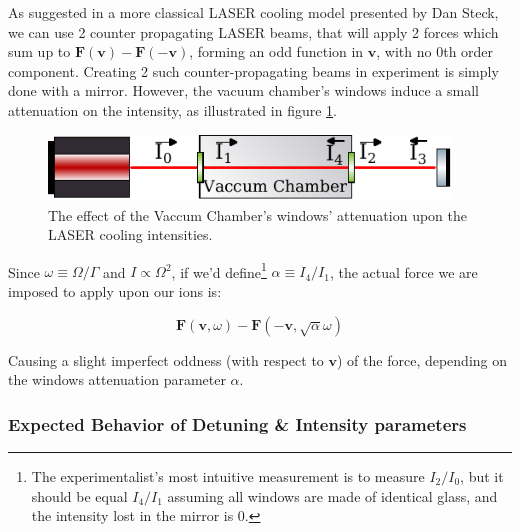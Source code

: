 
As suggested in a more classical LASER cooling model presented by Dan Steck\cite{SteckClassicalCooling}, we can use 2 counter propagating LASER beams, that will apply 2 forces which sum up to $\mathbf{F}(\mathbf{v}) - \mathbf{F}(-\mathbf{v})$, forming an odd function in $\mathbf{v}$, with no 0th order component. Creating 2 such counter-propagating beams in experiment is simply done with a mirror. However, the vacuum chamber's windows induce a small attenuation on the intensity, as illustrated in figure \ref{fig:windows-attenuation}.

\begin{figure}[h!]
	\begin{center}
		\includegraphics[width=0.95\textwidth]{graphics/windows-attenuation.pdf}
	\end{center}
	\caption{The effect of the Vaccum Chamber's windows' attenuation upon the LASER cooling intensities.}\label{fig:windows-attenuation}
\end{figure}

Since $\omega \equiv \Omega/\Gamma$ and $I \propto \Omega^2$, if we'd define\footnote{The experimentalist's most intuitive measurement is to measure $I_2/I_0$, but it should be equal $I_4/I_1$ assuming all windows are made of identical glass, and the intensity lost in the mirror is 0.} $\alpha \equiv I_4/I_1$, the actual force we are imposed to apply upon our ions is:

\begin{equation}
	\mathbf{F}(\mathbf{v}, \omega) - \mathbf{F}(-\mathbf{v}, \sqrt{\alpha}\omega)
\end{equation}

Causing a slight imperfect oddness (with respect to $\mathbf{v}$) of the force, depending on the windows attenuation parameter $\alpha$.

\subsubsection{Expected Behavior of Detuning \& Intensity parameters}


